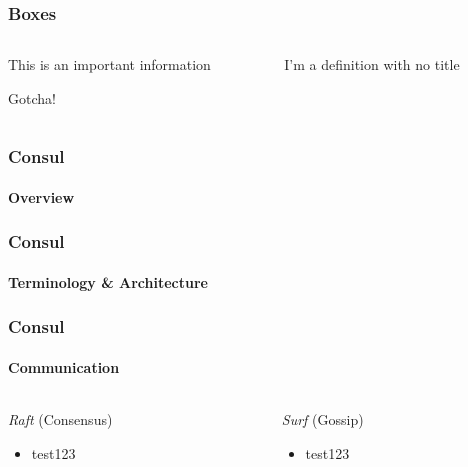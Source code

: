 


\begin{frame} %
	\frametitle{Boxes}
	\begin{columns}[t]
		\begin{column}{0.45\textwidth}
			\begin{block}
				This is an important information
			\end{block}
			\begin{alertblock}[Argh]
				Gotcha!
			\end{alertblock}
		\end{column}
		\begin{column}{0.45\textwidth}
			\begin{definition}
				I'm a definition with no title
			\end{definition}
		\end{column}
	\end{columns}
\end{frame}

\begin{frame}
	\frametitle{Consul}
	\framesubtitle{Overview}
\end{frame}

\begin{frame}
	\frametitle{Consul}
	\framesubtitle{Terminology \& Architecture}
\end{frame}

\begin{frame}
	\frametitle{Consul}
	\framesubtitle{Communication}
	\begin{columns}[b]
		\begin{column}{0.5\textwidth}
			\emph{Raft} (Consensus)
			\begin{itemize}
				\item test123
			\end{itemize}
		\end{column}
		\begin{column}{0.5\textwidth}
			\emph{Surf} (Gossip)
			\begin{itemize}
				\item test123
			\end{itemize}
		\end{column}
	\end{columns}
\end{frame}

